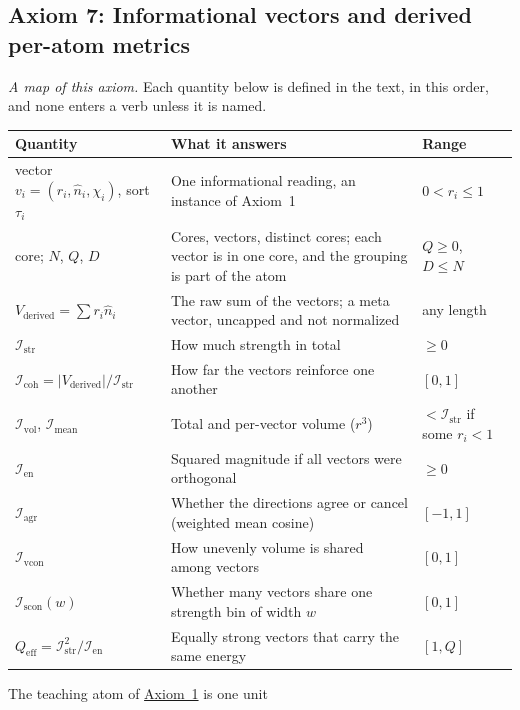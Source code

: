 \documentclass[12pt, a4paper]{article}
\begin{document}
\subsection{Axiom 7: Informational vectors and derived per-atom metrics}
\label{subsec:axiom_v1_metrics}
\emph{A map of this axiom.} Each quantity below is defined in the text, in this order, and none enters a verb unless it is named.
{\footnotesize
\begin{longtable}[c]{@{}>{\raggedright\arraybackslash}p{4.4cm}>{\raggedright\arraybackslash}p{6.4cm}>{\raggedright\arraybackslash}p{3.4cm}@{}}
\hline
Quantity & What it answers & Range \\ \hline
\endhead
vector $v_i=(r_i,\hat n_i,\chi_i)$, sort $\tau_i$ & One informational reading, an instance of Axiom~1 & $0<r_i\le1$ \\
core; $N$, $Q$, $D$ & Cores, vectors, distinct cores; each vector is in one core, and the grouping is part of the atom & $Q\ge0$, $D\le N$ \\
$V_{\text{derived}}=\sum r_i\hat n_i$ & The raw sum of the vectors; a meta vector, uncapped and not normalized & any length \\
$\mathcal{I}_{\mathrm{str}}$ & How much strength in total & $\ge0$ \\
$\mathcal{I}_{\mathrm{coh}}=\lvert V_{\text{derived}}\rvert/\mathcal{I}_{\mathrm{str}}$ & How far the vectors reinforce one another & $[0,1]$ \\
$\mathcal{I}_{\mathrm{vol}}$, $\mathcal{I}_{\mathrm{mean}}$ & Total and per-vector volume ($r^3$) & $<\mathcal{I}_{\mathrm{str}}$ if some $r_i<1$ \\
$\mathcal{I}_{\mathrm{en}}$ & Squared magnitude if all vectors were orthogonal & $\ge0$ \\
$\mathcal{I}_{\mathrm{agr}}$ & Whether the directions agree or cancel (weighted mean cosine) & $[-1,1]$ \\
$\mathcal{I}_{\mathrm{vcon}}$ & How unevenly volume is shared among vectors & $[0,1]$ \\
$\mathcal{I}_{\mathrm{scon}}(w)$ & Whether many vectors share one strength bin of width $w$ & $[0,1]$ \\
$Q_{\mathrm{eff}}=\mathcal{I}_{\mathrm{str}}^2/\mathcal{I}_{\mathrm{en}}$ & Equally strong vectors that carry the same energy & $[1,Q]$ \\ \hline
\end{longtable}}
\addtocounter{table}{-1}
The teaching atom of \hyperref[subsec:axiom1]{Axiom~1} is one unit
\end{document}
